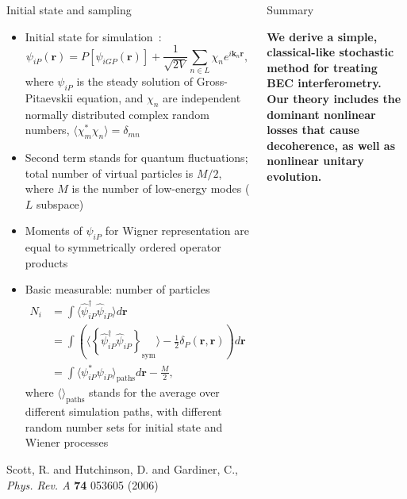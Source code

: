 \documentclass[final,hyperref={pdfpagelabels=false}]{beamer}
\begin{document}
\begin{frame}
\begin{columns}
{\begin{block}{Initial state and sampling}
\begin{itemize}
	\item Initial state for simulation~\cite{scott}:
\[
\psi_{iP}(\mathbf{r}) = P[\psi_{iGP}(\mathbf{r})] + \frac{1}{\sqrt{2V}} \sum\limits_{n \in L} \chi_n e^{i \mathbf{k}_n \mathbf{r}},
\]
		where $\psi_{iP}$ is the steady solution of Gross-Pitaevskii equation,
		and $\chi_n$ are independent normally distributed complex random numbers,
		$\langle \chi_m^* \chi_n \rangle = \delta_{mn}$
	\item Second term stands for quantum fluctuations; total number of virtual particles is $M/2$,
		where $M$ is the number of low-energy modes ($L$ subspace)
	\item Moments of $\psi_{iP}$ for Wigner representation are equal to symmetrically ordered operator products
	\item Basic measurable: number of particles
\begin{align*}
N_i & = \int \langle \hat{\psi}_{iP}^\dagger \hat{\psi}_{iP} \rangle d\mathbf{r} \\
& = \int \left( \langle \left\{ \hat{\psi}_{iP}^\dagger \hat{\psi}_{iP} \right\}_{\textrm{sym}} \rangle -
	\frac{1}{2} \delta_P(\mathbf{r}, \mathbf{r})  \right) d\mathbf{r} \\
& = \int \langle \psi_{iP}^* \psi_{iP} \rangle_{\textrm{paths}} d\mathbf{r} - \frac{M}{2},
\end{align*}
	where $\langle \rangle_{\textrm{paths}}$ stands for the average over different simulation paths,
	with different random number sets for initial state and Wiener processes

\end{itemize}

\tiny{ \begin{thebibliography}{9}
	 Scott, R. and Hutchinson, D. and Gardiner, C., \textit{Phys. Rev. A} \textbf{74} 053605 (2006)
\end{thebibliography} }
\end{block}

\begin{block}{Summary}

\bf{We derive a simple, classical-like stochastic method for treating BEC interferometry.
Our theory includes the dominant nonlinear losses that cause decoherence, as well as nonlinear unitary evolution.}

\end{block}

} %

\end{columns}
\end{frame}
\end{document}
